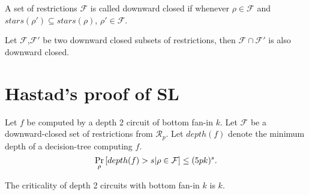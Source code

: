 \documentclass{article}
\newcommand{\calF}{\mathcal{F}}
\newcommand{\Rp}{\mathcal{R}_p}
\begin{document}
\begin{definition}
	\label{def: downward closure}
	A set of restrictions $\calF$ is called downward closed if whenever $\rho \in \calF$ 
	and $stars(\rho') \subseteq stars(\rho)$, $\rho' \in \calF$. 
\end{definition}
    
\begin{lemma}
	\label{lem: downclosure intersection}
    Let $\calF$,$\calF'$ be two downward closed subsets of restrictions, then $\calF \cap \calF'$ 
    is also downward closed.  
\end{lemma}

\section{Hastad's proof of SL}

\begin{lemma}
	\label{lem: hastad switching lemma}    
    Let $f$ be computed by a depth 2 circuit of bottom fan-in $k$. Let $\calF$ be a downward-closed 
    set of restrictions from $\Rp$. Let $depth(f)$ denote the minimum depth of a decision-tree 
    computing $f$. 
	$$\prob{\rho}{depth(f)>s|\rho \in \calF} \leq (5pk)^s.$$
\end{lemma}
    
\begin{theorem}
	The criticality of  depth 2 circuits with bottom fan-in $k$ is $k$.  
\end{theorem}
    
\end{document}
